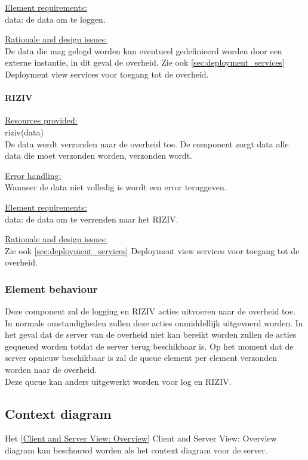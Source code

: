 \documentclass[a4paper,10pt]{article}
\begin{document}
\underline{Element requirements:}\\
data: de data om te loggen.

\underline{Rationale and design issues:}\\
De data die mag gelogd worden kan eventueel gedefinieerd worden door een externe instantie, in dit geval de overheid.
Zie ook \ref{sec:deployment_services} Deployment view services voor toegang tot de overheid.

\paragraph{RIZIV}
\underline{Resources provided:}\\
riziv(data)\\
De data wordt verzonden naar de overheid toe.  De component zorgt data alle data die moet verzonden worden, verzonden wordt.

\underline{Error handling:}\\
Wanneer de data niet volledig is wordt een error teruggeven.

\underline{Element requirements:}\\
data: de data om te verzenden naar het RIZIV.

\underline{Rationale and design issues:}\\
Zie ook \ref{sec:deployment_services} Deployment view services voor toegang tot de overheid.

\subsubsection{Element behaviour}
Deze component zal de logging en RIZIV acties uitvoeren naar de overheid toe.  In normale omstandigheden zullen deze acties onmiddellijk uitgevoerd worden.  In het geval dat de server van de overheid niet kan bereikt worden zullen de acties gequeued worden totdat de server terug beschikbaar is.  Op het moment dat de server opnieuw beschikbaar is zal de queue element per element verzonden worden naar de overheid.\\
Deze queue kan anders uitgewerkt worden voor log en RIZIV.

\subsection{Context diagram}
Het \ref{Client and Server View: Overview} Client and Server View: Overview diagram kan beschouwd worden als het context diagram voor de server.
\end{document}
